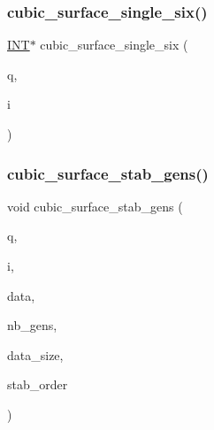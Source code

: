 \mbox{\label{data_8_c_a526ae8988443f7373c98d46d1eaa9d12}} 
\subsubsection{\texorpdfstring{cubic\+\_\+surface\+\_\+single\+\_\+six()}{cubic\_surface\_single\_six()}}
{\footnotesize\ttfamily \mbox{\hyperlink{galois_8h_a09fddde158a3a20bd2dcadb609de11dc}{I\+NT}}$\ast$ cubic\+\_\+surface\+\_\+single\+\_\+six (\begin{DoxyParamCaption}\item[{\mbox{\hyperlink{galois_8h_a09fddde158a3a20bd2dcadb609de11dc}{I\+NT}}}]{q,  }\item[{\mbox{\hyperlink{galois_8h_a09fddde158a3a20bd2dcadb609de11dc}{I\+NT}}}]{i }\end{DoxyParamCaption})}

\mbox{\label{data_8_c_a106411b4e1f342f5985c419fd3583d77}} 
\subsubsection{\texorpdfstring{cubic\+\_\+surface\+\_\+stab\+\_\+gens()}{cubic\_surface\_stab\_gens()}}
{\footnotesize\ttfamily void cubic\+\_\+surface\+\_\+stab\+\_\+gens (\begin{DoxyParamCaption}\item[{\mbox{\hyperlink{galois_8h_a09fddde158a3a20bd2dcadb609de11dc}{I\+NT}}}]{q,  }\item[{\mbox{\hyperlink{galois_8h_a09fddde158a3a20bd2dcadb609de11dc}{I\+NT}}}]{i,  }\item[{\mbox{\hyperlink{galois_8h_a09fddde158a3a20bd2dcadb609de11dc}{I\+NT}} $\ast$\&}]{data,  }\item[{\mbox{\hyperlink{galois_8h_a09fddde158a3a20bd2dcadb609de11dc}{I\+NT}} \&}]{nb\+\_\+gens,  }\item[{\mbox{\hyperlink{galois_8h_a09fddde158a3a20bd2dcadb609de11dc}{I\+NT}} \&}]{data\+\_\+size,  }\item[{const \mbox{\hyperlink{galois_8h_ab6cc7b4aeb6ea31aba2b3fbfc83ff5e6}{B\+Y\+TE}} $\ast$\&}]{stab\+\_\+order }\end{DoxyParamCaption})}

